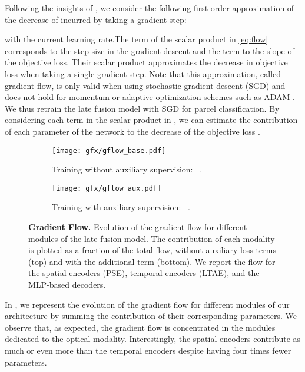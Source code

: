 Following the insights of  \citet{wang2020picking}, we consider the following first-order approximation of the decrease of  incurred by taking a gradient step:

with  the current learning rate.The term  of the scalar product in \eqref{eq:flow} corresponds to the step size in the gradient descent and the term  to the slope of the objective loss. Their scalar product approximates the decrease in objective loss when taking a single gradient step. Note that this approximation, called gradient flow, is only valid when using stochastic gradient descent (SGD) and does not hold for momentum or adaptive optimization schemes {such as ADAM \citep{kingma2014adam}}. We thus retrain the late fusion model with SGD for parcel classification. By considering each term in the scalar product in , we can estimate the contribution of each parameter of the network to the decrease of the objective loss .
\begin{figure}[h]
    \centering
    \begin{subfigure}{\linewidth}
    \centering
    \texttt{[image: gfx/gflow\_base.pdf]}
    \caption{Training without auxiliary supervision: ~.}
    \label{fig:gflow:base}
    \end{subfigure}
    \vfill
    \begin{subfigure}{\linewidth}
    \centering
    \texttt{[image: gfx/gflow\_aux.pdf]}
    \caption{Training with auxiliary supervision: ~.}
    \label{fig:gflow:aux}
    \end{subfigure}
    \caption{{\bf Gradient Flow.} Evolution of the gradient flow for different modules of the late fusion model. The contribution of each modality is plotted as a fraction of the total flow, without auxiliary loss terms (top) and with the additional  term (bottom). We report the flow for the spatial encoders (PSE), temporal encoders (LTAE), and the MLP-based decoders.}
    \label{fig:gflow}
\end{figure}

In , we represent the evolution of the gradient flow for different modules of our architecture by summing the contribution of their corresponding parameters.
We observe that, as expected, the gradient flow is concentrated in the modules dedicated to the optical modality. Interestingly, the spatial encoders contribute as much or even more than the temporal encoders despite having four times fewer parameters.

